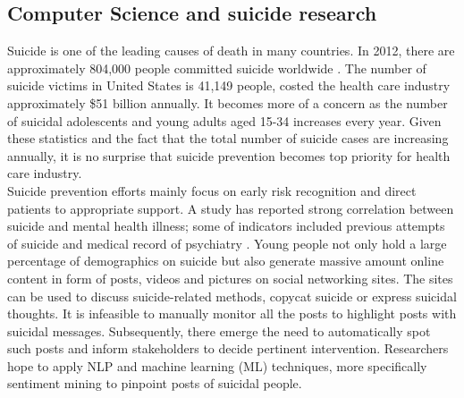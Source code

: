 \subsection*{Computer Science and suicide research}
Suicide is one of the leading causes of death in many countries. In 2012, there are approximately 804,000 people committed suicide worldwide \cite{WorldHealthOrganization2014}. The number of suicide victims in United States is 41,149 people, costed the health care industry approximately \$51 billion annually\cite{CentersforDiseaseControlandPreventionCDC2013}. It becomes more of a concern as the number of suicidal adolescents and young adults aged 15-34 increases every year. Given these statistics and the fact that the total number of suicide cases are increasing annually, it is no surprise that suicide prevention becomes top priority for health care industry.\\
Suicide prevention efforts mainly focus on early risk recognition and direct patients to appropriate support. A study has reported strong correlation between suicide and mental health illness; some of indicators included previous attempts of suicide and medical record of psychiatry \cite{Harris1997}. Young people not only hold a large percentage of demographics on suicide but also generate massive amount online content in form of posts, videos and pictures on social networking sites. The sites can be used to discuss suicide-related methods, copycat suicide or express suicidal thoughts. It is infeasible to manually monitor all the posts to highlight posts with suicidal messages. Subsequently, there emerge the need to automatically spot such posts and inform stakeholders to decide pertinent intervention. Researchers hope to apply NLP and machine learning (ML) techniques, more specifically sentiment mining to pinpoint posts of suicidal people. 
